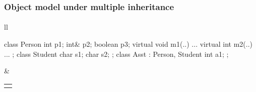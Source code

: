 \documentclass[handout]{beamer}
\begin{document}
\begin{frame}[fragile]
\frametitle{Object model under multiple inheritance}
\framesubtitle{}
\begin{tabular}{ll}
\begin{minipage}{4.3cm}
\begin{cplus3}
class Person
{ 
   int p1;
   int& p2;
   boolean p3; 
   virtual void m1(..) {...}
   virtual int m2(..) {...}  
};
class Student 
{
   char s1;
   char s2;
};
class Asst : Person, Student 
{
    int a1;
};
\end{cplus3}
\end{minipage}

& 

\begin{tabular}{l}
{\small 
\begin{tikzpicture}

\draw (0,-2.5)  rectangle (1.2,-3.0);
\pgftext[at={\pgfpoint{0.5cm}{-2.75cm}}]{a1} ;

\draw (0,-2.5)  rectangle (1.2,-2.0);
\pgftext[at={\pgfpoint{0.5cm}{-2.25cm}}]{} ;
\draw[->, thick] (1.0, -2.25) -- (3.0,-2.25); 
\pgftext[at={\pgfpoint{3.8cm}{-2.25cm}}]{\textit{vtbl Asst}} ;

\draw (0,-2.0)  rectangle (1.2,-1.0);
\pgftext[at={\pgfpoint{0.5cm}{-1.25cm}}]{s1} ;
\pgftext[at={\pgfpoint{0.5cm}{-1.75cm}}]{s2} ;

\draw (0,-1.0)  rectangle (1.2,-0.5);
\pgftext[at={\pgfpoint{-0.25cm}{-0.75cm}}]{} ;
\draw[->, thick] (1.0, -0.75) -- (3.0,-0.75); 
\pgftext[at={\pgfpoint{4.0cm}{-0.75cm}}]{\textit{vtbl Student}} ;

\pgftext[at={\pgfpoint{0.5cm}{-0.25cm}}]{p1} ;
\pgftext[at={\pgfpoint{0.5cm}{0.25cm}}]{p2} ;
\pgftext[at={\pgfpoint{0.5cm}{0.75cm}}]{p3} ;
\draw (0,-0.5)  rectangle (1.2,1.5);

\draw (0,1.0)  rectangle (1.2,1.5);
\pgftext[at={\pgfpoint{0.5cm}{1.25cm}}]{} ;
\draw[->, thick] (1.0, 1.25) -- (3.0,1.25); 











\end{tikzpicture}}
\end{tabular}
\end{tabular}
\end{frame}
\end{document}
